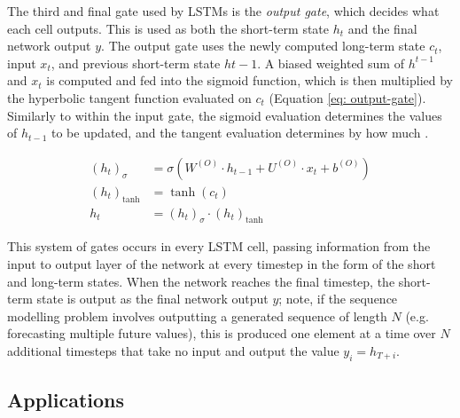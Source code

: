 \documentclass[a4paper, 11pt]{report}
\begin{document}
    The third and final gate used by LSTMs is the \emph{output gate}, which decides what each cell outputs. This is used as both the short-term state $h_t$ and the final network output $y$. The output gate uses the newly computed long-term state $c_t$, input $x_t$, and previous short-term state $h{t-1}$. A biased weighted sum of $h^{t-1}$ and $x_t$ is computed and fed into the sigmoid function, which is then multiplied by the hyperbolic tangent function evaluated on $c_t$ (Equation \ref{eq: output-gate}). Similarly to within the input gate, the sigmoid evaluation determines the values of $h_{t-1}$ to be updated, and the tangent evaluation determines by how much \citep{zhang-2021}.

    \begin{align}
        \label{eq: output-gate}
        (h_t)_{\sigma} &= \sigma( W^{(O)} \cdot h_{t-1} + U^{(O)} \cdot x_t + b^{(O)} ) \\
        (h_t)_{\tanh} &= \tanh{( c_t )} \\
        h_t &= (h_t)_{\sigma} \cdot (h_t)_{\tanh}
    \end{align}

    This system of gates occurs in every LSTM cell, passing information from the input to output layer of the network at every timestep in the form of the short and long-term states. When the network reaches the final timestep, the short-term state is output as the final network output $y$; note, if the sequence modelling problem involves outputting a generated sequence of length $N$ (e.g. forecasting multiple future values), this is produced one element at a time over $N$ additional timesteps that take no input and output the value $y_i = h_{T+i}$.


    \subsection{Applications}
\end{document}
